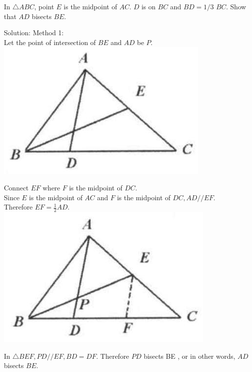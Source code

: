 \documentclass{article}
\begin{document}
In \(\triangle A B C\), point \(E\) is the midpoint of \(A C\). \(D\) is on \(B C\) and \(B D=1 / 3\) \(B C\). Show that \(A D\) bisects \(B E\).

Solution:
Method 1:\\
Let the point of intersection of \(B E\) and \(A D\) be \(P\).\\
\centering
\includegraphics[width=\textwidth]{images/036(1).jpg}

Connect \(E F\) where \(F\) is the midpoint of \(D C\).\\
Since \(E\) is the midpoint of \(A C\) and \(F\) is the midpoint of \(D C, A D / / E F\).\\
Therefore \(E F=\frac{1}{2} A D\).\\
\centering
\includegraphics[width=\textwidth]{images/036.jpg}

In \(\triangle B E F, P D / / E F, B D=D F\). Therefore \(P D\) bisects BE , or in other words, \(A D\) bisects \(B E\).
\end{document}
